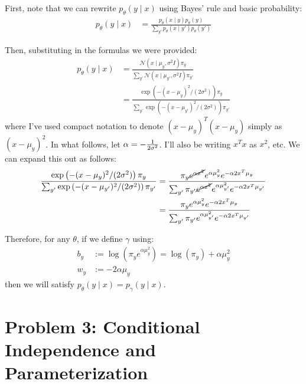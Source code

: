 \documentclass[11pt]{article}
\newcommand\p{\noindent}
\begin{document}
\p First, note that we can rewrite $p_{\theta}(y \mid x)$ using Bayes' rule and basic probability:
\begin{align}
	p_{\theta}(y \mid x)
		&= \frac{p_{\theta}(x \mid  y) p_{\theta}(y)}{ \sum_{y'}   p_{\theta}(x \mid  y') p_{\theta}(y')   }
\end{align}

\p Then, substituting in the formulas we were provided:
\begin{align}
p_{\theta}(y \mid x)
	&= \frac{   \mathcal{N}(x \mid \mu_y, \sigma^2 I) \pi_y       }{ \sum_{y'}    \mathcal{N}(x \mid \mu_{y'}, \sigma^2 I) \pi_{y'}      } \\
	&= \frac{    \exp \left( - (x - \mu_{y} )^2 / (2 \sigma^2)  \right) \pi_y    }{ \sum_{y'}  \exp \left( - (x - \mu_{y'} )^2 / (2 \sigma^2)  \right) \pi_{y'}    }
\end{align}
where I've used compact notation to denote $(x - \mu_y)^T(x - \mu_y)$ simply as $(x - \mu_y)^2$. In what follows, let $\alpha = - \frac{1}{2\sigma^2}$. I'll also be writing $x^T x$ as $x^2$, etc. We can expand this out as follows:
\begin{align}
	\frac{    \exp \left( - (x - \mu_{y} )^2 / (2 \sigma^2)  \right) \pi_y    }{ \sum_{y'}  \exp \left( - (x - \mu_{y'} )^2 / (2 \sigma^2)  \right) \pi_{y'}    } 
		&= \frac{  
			\pi_y \cancel { e^{\alpha x^2} } e^{\alpha \mu_y^2} e^{-\alpha 2 x^T \mu_y}
		}{
		\sum_{y'}  \pi_{y'} \cancel{ e^{\alpha x^2} } e^{\alpha \mu_{y'}^2} e^{-\alpha 2 x^T \mu_{y'}}
		} \\
		&= \frac{  
			\pi_y e^{\alpha \mu_y^2} e^{-\alpha 2 x^T \mu_y}
		}{
			\sum_{y'}  \pi_{y'}  e^{\alpha \mu_{y'}^2} e^{-\alpha 2 x^T \mu_{y'}}
		} \\
\end{align}

\p Therefore, for any $\theta$, if we define $\gamma$ using:
\begin{align}
	b_y &:= \log( \pi_y e^{\alpha \mu_y^2} ) = \log(\pi_y) + \alpha \mu_y^2 \\
	w_y &:= -2\alpha \mu_{y}
\end{align}
then we will satisfy $p_{\theta}(y \mid x) = p_{\gamma}(y \mid x)$. 




\clearpage
\section*{Problem 3: Conditional Independence and Parameterization}
\end{document}
